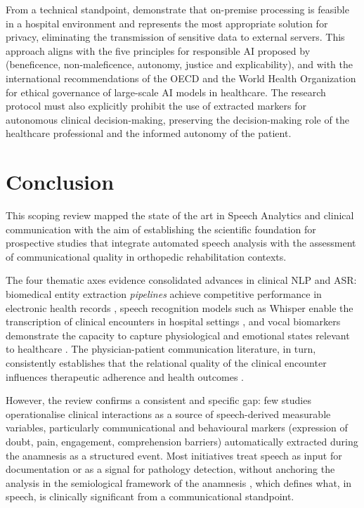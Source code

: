 \documentclass[review,12pt]{elsarticle}
\begin{document}
From a technical standpoint, \citet{Klusty2025}
demonstrate that on-premise processing is feasible in a hospital environment
and represents the most appropriate solution for privacy, eliminating the
transmission of sensitive data to external servers.
This approach aligns with the five principles for responsible AI proposed by
\citet{Floridi2018} (beneficence, non-maleficence, autonomy, justice and
explicability), and with the international recommendations of the OECD
\citep{OECD2024} and the World Health Organization \citep{WHO2024} for
ethical governance of large-scale AI models in healthcare.
The research protocol must also explicitly prohibit the use of extracted
markers for autonomous clinical decision-making, preserving the
decision-making role of the healthcare professional and the informed autonomy
of the patient.

\section{Conclusion}
\label{sec:conclusao}

This scoping review mapped the state of the art in Speech Analytics and
clinical communication with the aim of establishing the scientific foundation
for prospective studies that integrate automated speech analysis with the
assessment of communicational quality in orthopedic rehabilitation contexts.

The four thematic axes evidence consolidated advances in clinical NLP and ASR:
biomedical entity extraction \textit{pipelines} achieve competitive performance
in electronic health records \citep{Bazoge2023,Koleck2019}, speech recognition
models such as Whisper \citep{Radford2023} enable the transcription of clinical
encounters in hospital settings \citep{Klusty2025,Ng2025}, and vocal
biomarkers demonstrate the capacity to capture physiological and emotional
states relevant to healthcare \citep{Fagherazzi2021,Albert2024}.
The physician-patient communication literature, in turn, consistently
establishes that the relational quality of the clinical encounter influences
therapeutic adherence and health outcomes \citep{Kelley2014,Rucinski2022}.

However, the review confirms a consistent and specific gap: few studies
operationalise clinical interactions as a source of speech-derived measurable
variables, particularly communicational and behavioural markers (expression of
doubt, pain, engagement, comprehension barriers) automatically extracted
during the anamnesis as a structured event.
Most initiatives treat speech as input for documentation or as a signal for
pathology detection, without anchoring the analysis in the semiological
framework of the anamnesis \citep{Porto2019}, which defines what, in speech,
is clinically significant from a communicational standpoint.
\end{document}
